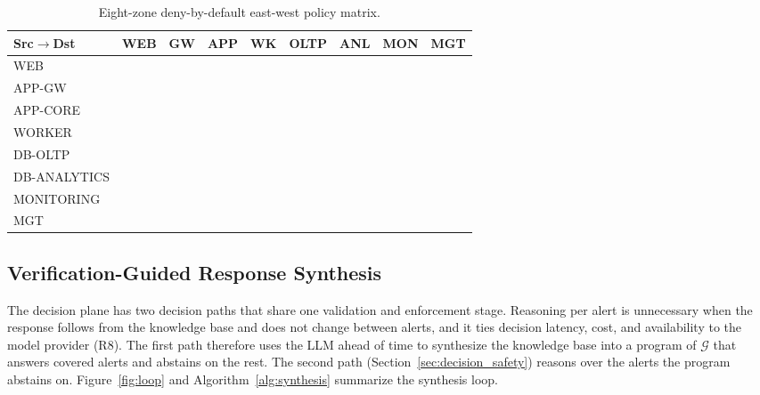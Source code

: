 \documentclass[final,5p]{elsarticle}
\newcommand{\cmark}{\textcolor{ForestGreen}{\ding{51}}}
\newcommand{\xmark}{\textcolor{BrickRed}{\ding{55}}}
\begin{document}
\begin{table}[tbp]
    \centering
    \caption{Eight-zone deny-by-default east-west policy matrix.}
    \label{tab:policy_matrix}
    \scriptsize
    \setlength{\tabcolsep}{0.8pt}
    \renewcommand{\arraystretch}{1.05}
    \begin{tabular}{@{}lcccccccc@{}}
        \toprule
        \textbf{Src$\rightarrow$Dst} & \textbf{WEB} & \textbf{GW} & \textbf{APP} & \textbf{WK} & \textbf{OLTP} & \textbf{ANL} & \textbf{MON} & \textbf{MGT} \\
        \midrule
        WEB          &  & \cmark & \xmark & \xmark & \xmark & \xmark & \xmark & \xmark \\
        APP-GW       & \xmark &  & \cmark & \xmark & \xmark & \xmark & \xmark & \xmark \\
        APP-CORE     & \xmark & \xmark &  & \cmark & \cmark & \cmark & \xmark & \xmark \\
        WORKER       & \xmark & \xmark & \xmark &  & \cmark & \xmark & \xmark & \xmark \\
        DB-OLTP      & \xmark & \xmark & \xmark & \xmark &  & \cmark & \xmark & \xmark \\
        DB-ANALYTICS & \xmark & \xmark & \xmark & \xmark & \xmark &  & \xmark & \xmark \\
        MONITORING   & \cmark & \cmark & \cmark & \cmark & \cmark & \cmark &  & \xmark \\
        MGT          & \cmark & \cmark & \cmark & \cmark & \cmark & \cmark & \cmark &  \\
        \bottomrule
    \end{tabular}
\end{table}

\subsection{Verification-Guided Response Synthesis}
\label{sec:synthesis}

The decision plane has two decision paths that share one validation and enforcement stage. Reasoning per alert is unnecessary when the response follows from the knowledge base and does not change between alerts, and it ties decision latency, cost, and availability to the model provider (R8). The first path therefore uses the LLM ahead of time to synthesize the knowledge base into a program of $\mathcal{G}$ that answers covered alerts and abstains on the rest. The second path (Section~\ref{sec:decision_safety}) reasons over the alerts the program abstains on. Figure~\ref{fig:loop} and Algorithm~\ref{alg:synthesis} summarize the synthesis loop.
\end{document}
